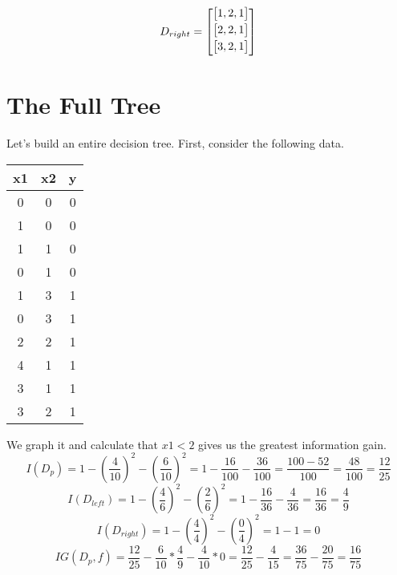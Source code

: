\documentclass{article}
\begin{document}
\begin{center}
\begin{minipage}{0.2\textwidth}
            $$D_{right} = 
        \begin{bmatrix}

        \vspace{1mm}
         \begin{bmatrix}
         1,2,1 \\ 
         \end{bmatrix} \\
        \vspace{1mm}
         \begin{bmatrix}
         2,2,1 \\ 
         \end{bmatrix} \\
        \vspace{1mm}
         \begin{bmatrix}
         3,2,1 \\
        \end{bmatrix} \\
         \end{bmatrix}
        $$
\end{minipage}\quad
\end{center}


\section{The Full Tree}

Let's build an entire decision tree.
First, consider the following data.
\begin{center}
\begin{tabular}{ |c|c|c| } 
 \hline
 x1 & x2 & y \\
 \hline
 0 & 0 & 0 \\
 1 & 0 & 0 \\ 
 1 & 1 & 0 \\
 0 & 1 & 0 \\
 1 & 3 & 1 \\
 0 & 3 & 1 \\ 
 2 & 2 & 1 \\
 4 & 1 & 1 \\
 3 & 1 & 1 \\
 3 & 2 & 1 \\
 \hline
\end{tabular}
\end{center}
We graph it and calculate that $x1<2$ gives us the greatest information gain.
\[I(D_p) = 1 - \left(\frac{4}{10} \right)^2 - \left(\frac{6}{10}\right)^2 = 1 - \frac{16}{100} - \frac{36}{100} = \frac{100-52}{100} = \frac{48}{100} = \frac{12}{25}\]
\[I(D_{left}) = 1 - \left( \frac{4}{6}\right)^2 - \left(\frac{2}{6}\right)^2 = 1 - \frac{16}{36} - \frac{4}{36} = \frac{16}{36} = \frac{4}{9}\]
\[I(D_{right}) = 1 - \left(\frac{4}{4}\right)^2 - \left(\frac{0}{4}\right)^2 = 1 - 1 = 0\]
\[IG(D_p, f) = \frac{12}{25} - \frac{6}{10}*\frac{4}{9} - \frac{4}{10}*0 = \frac{12}{25} - \frac{4}{15} = \frac{36}{75} - \frac{20}{75} = \frac{16}{75}\]
\end{document}
